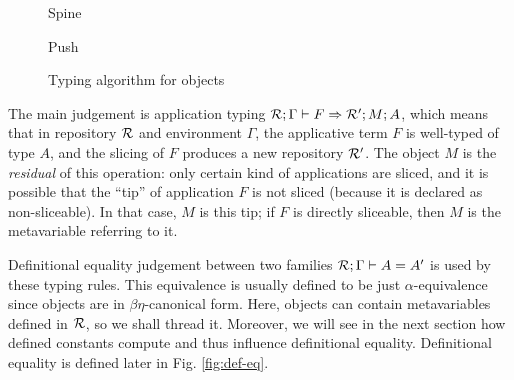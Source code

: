\documentclass[9pt]{sigplanconf}
\begin{document}
\begin{figure*}
  \begin{mathpar}

  \end{mathpar}

  \qquad
  {Spine}

  \begin{mathpar}

  \end{mathpar}

  \qquad
  {Push}

  \begin{mathpar}
  \end{mathpar}

  \caption{Typing algorithm for objects}
  \label{fig:obj-typing}
\end{figure*}

The main judgement is application typing $\jf\mr\Gamma F \mmr M A$,
which means that in repository $\mr$ and environment $\Gamma$, the
applicative term $F$ is well-typed of type $A$, and the slicing of $F$
produces a new repository $\mmr$. The object $M$ is the
\emph{residual} of this operation: only certain kind of applications
are sliced, and it is possible that the ``tip'' of application $F$ is
not sliced (because it is declared as non-sliceable). In that case,
$M$ is this tip; if $F$ is directly sliceable, then $M$ is the
metavariable referring to it.

Definitional equality judgement between two families $\jea\mr\Gamma A
{A'}$ is used by these typing rules. This equivalence is usually
defined to be just $\alpha$-equivalence since objects are in
$\beta\eta$-canonical form. Here, objects can contain metavariables
defined in $\mr$, so we shall thread it. Moreover, we will see in the
next section how defined constants compute and thus influence
definitional equality. Definitional equality is defined later in Fig.
\ref{fig:def-eq}.
\end{document}
